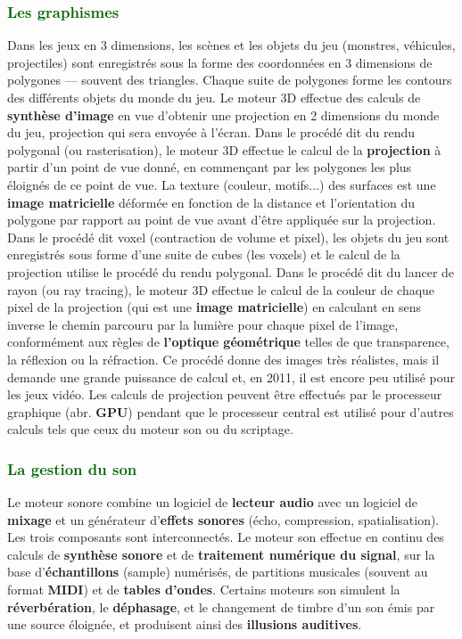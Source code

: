 \documentclass[ebook, 8pt, oneside, openany]{memoir}
\begin{document}
	\subsubsection{\textcolor{darkgreen}{Les graphismes}}
	Dans les jeux en 3 dimensions, les scènes et les objets du jeu (monstres, véhicules, projectiles) sont
	enregistrés sous la forme des coordonnées en 3 dimensions de polygones — souvent des triangles. Chaque
	suite de polygones forme les contours des différents objets du monde du jeu. Le moteur 3D effectue des
	calculs de \textbf{synthèse d'image} en vue d'obtenir une projection en 2 dimensions du monde du jeu,
	projection qui sera envoyée à l'écran. Dans le procédé dit du rendu polygonal (ou rasterisation), le
	moteur 3D effectue le calcul de la \textbf{projection} à partir d'un point de vue donné, en commençant
	par les polygones les plus éloignés de ce point de vue. La texture (couleur, motifs...) des surfaces est
	une \textbf{image matricielle} déformée en fonction de la distance et l'orientation du polygone par
	rapport au point de vue avant d'être appliquée sur la projection. Dans le procédé dit voxel (contraction
	de volume et pixel), les objets du jeu sont enregistrés sous forme d'une suite de cubes (les voxels) et 
	le calcul de la projection utilise le procédé du rendu polygonal. Dans le procédé dit du lancer de rayon
	(ou ray tracing), le moteur 3D effectue le calcul de la couleur de chaque pixel de la projection (qui
	est une \textbf{image matricielle}) en calculant en sens inverse le chemin parcouru par la lumière pour
	chaque pixel de l'image, conformément aux règles de \textbf{l'optique géométrique} telles de que
	transparence, la réflexion ou la réfraction. Ce procédé donne des images très réalistes, mais il demande
	une grande puissance de calcul et, en 2011, il est encore peu utilisé pour les jeux vidéo. Les calculs
	de projection peuvent être effectués par le processeur graphique (abr. \textbf{GPU}) pendant que le
	processeur central est utilisé pour d'autres calculs tels que ceux du moteur son ou du scriptage.
	\subsubsection{\textcolor{darkgreen}{La gestion du son}}
	Le moteur sonore combine un logiciel de \textbf{lecteur audio} avec un logiciel de \textbf{mixage} et un
	générateur d'\textbf{effets sonores} (écho, compression, spatialisation). Les trois composants sont
	interconnectés. Le moteur son effectue en continu des calculs de \textbf{synthèse sonore} et de
	\textbf{traitement numérique du signal}, sur la base d'\textbf{échantillons} (sample) numérisés, de 
	partitions musicales (souvent au format \textbf{MIDI}) et de \textbf{tables d'ondes}. Certains moteurs 
	son simulent la \textbf{réverbération}, le \textbf{déphasage}, et le changement de timbre d'un son émis
	par une source éloignée, et produisent ainsi des \textbf{illusions auditives}.
\end{document}
